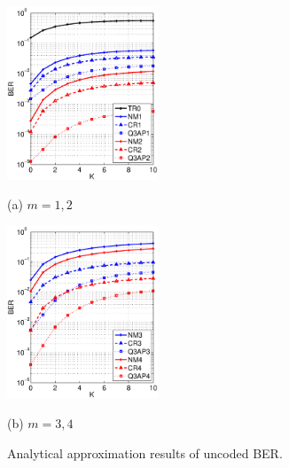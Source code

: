 \documentclass[journal]{IEEEtran}
\begin{document}
\begin{figure}[!t]
  \begin{minipage}[b]{.48\linewidth}
    \centering
    \centerline{\includegraphics[width=4.5cm]{./figs/BER_K_upperbound_64QAM_12.eps}}
    \centerline{(a) $m=1,2$}\medskip
  \end{minipage}
  \hfill
  \begin{minipage}[b]{0.48\linewidth}
    \centering
    \centerline{\includegraphics[width=4.5cm]{./figs/BER_K_upperbound_64QAM_34.eps}}
    \centerline{(b) $m=3,4$}\medskip
  \end{minipage}
  \vspace{-10pt}
  \caption{Analytical approximation results of uncoded BER.}
  \label{fig:uncoded_K_approx}
\end{figure}
\end{document}
